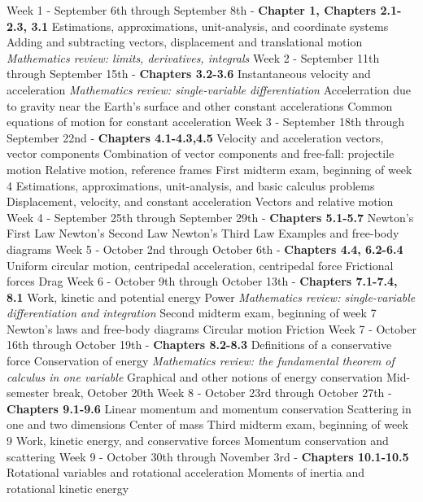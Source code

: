 \documentclass[10pt]{article}
\begin{document}
\begin{outline}[enumerate]
\1 Week 1 - September 6th through September 8th - \textbf{Chapter 1, Chapters 2.1-2.3, 3.1}
\2 Estimations, approximations, unit-analysis, and coordinate systems
\2 Adding and subtracting vectors, displacement and translational motion
\2 \textit{Mathematics review: limits, derivatives, integrals}
\1 Week 2 - September 11th through September 15th - \textbf{Chapters 3.2-3.6}
\2 Instantaneous velocity and acceleration
\3 \textit{Mathematics review: single-variable differentiation}
\2 Accelerration due to gravity near the Earth's surface and other constant accelerations
\2 Common equations of motion for constant acceleration	
\1 Week 3 - September 18th through September 22nd - \textbf{Chapters 4.1-4.3,4.5}
\2 Velocity and acceleration vectors, vector components
\2 Combination of vector components and free-fall: projectile motion
\2 Relative motion, reference frames
\1 First midterm exam, beginning of week 4
\2 Estimations, approximations, unit-analysis, and basic calculus problems
\2 Displacement, velocity, and constant acceleration
\2 Vectors and relative motion
\1 Week 4 - September 25th through September 29th - \textbf{Chapters 5.1-5.7}
\2 Newton's First Law
\2 Newton's Second Law
\2 Newton's Third Law
\2 Examples and free-body diagrams
\1 Week 5 - October 2nd through October 6th - \textbf{Chapters 4.4, 6.2-6.4}
\2 Uniform circular motion, centripedal acceleration, centripedal force
\2 Frictional forces
\2 Drag
\1 Week 6 - October 9th through October 13th - \textbf{Chapters 7.1-7.4, 8.1}
\2 Work, kinetic and potential energy
\2 Power
\3 \textit{Mathematics review: single-variable differentiation and integration}
\1 Second midterm exam, beginning of week 7
\2 Newton's laws and free-body diagrams
\2 Circular motion
\2 Friction
\1 Week 7 - October 16th through October 19th - \textbf{Chapters 8.2-8.3}
\2 Definitions of a conservative force
\2 Conservation of energy
\3 \textit{Mathematics review: the fundamental theorem of calculus in one variable}
\3 Graphical and other notions of energy conservation
\1 Mid-semester break, October 20th
\1 Week 8 - October 23rd through October 27th - \textbf{Chapters 9.1-9.6}
\2 Linear momentum and momentum conservation
\2 Scattering in one and two dimensions
\2 Center of mass
\1 Third midterm exam, beginning of week 9
\2 Work, kinetic energy, and conservative forces
\2 Momentum conservation and scattering
\1 Week 9 - October 30th through November 3rd - \textbf{Chapters 10.1-10.5}
\2 Rotational variables and rotational acceleration
\2 Moments of inertia and rotational kinetic energy

\end{outline}
\end{document}
